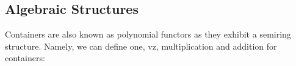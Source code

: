 {\subsection{Algebraic Structures}

Containers are also known as polynomial functors as they exhibit a semiring structure. Namely, we can define one, vz, multiplication and addition for containers:

\begin{code}%
\>[0]\AgdaSpace{}%
\AgdaSymbol{:}\AgdaSpace{}%
\<%
\\
\>[0]\AgdaSpace{}%
\AgdaSymbol{=}\AgdaSpace{}%
\AgdaSpace{}%
\AgdaSpace{}%
\AgdaSpace{}%
\<%
\\
%
\\[\AgdaEmptyExtraSkip]%
\>[0]\AgdaSpace{}%
\AgdaSymbol{:}\AgdaSpace{}%
\<%
\\
\>[0]\AgdaSpace{}%
\AgdaSymbol{=}\AgdaSpace{}%
\AgdaSpace{}%
\AgdaSpace{}%
\<%
\\
%
\\[\AgdaEmptyExtraSkip]%
\>[0]\AgdaSpace{}%
\AgdaSymbol{:}\AgdaSpace{}%
\AgdaSpace{}%
\AgdaSpace{}%
\AgdaSpace{}%
\AgdaSpace{}%
\<%
\\
\>[0]\AgdaSymbol{(}\AgdaSpace{}%
\AgdaSpace{}%
\AgdaSymbol{)}\AgdaSpace{}%
\AgdaSpace{}%
\AgdaSymbol{(}\AgdaSpace{}%
\AgdaSpace{}%
\AgdaSymbol{)}\AgdaSpace{}%
\AgdaSymbol{=}\AgdaSpace{}%
\AgdaSymbol{(}\AgdaSpace{}%
\AgdaSpace{}%
\AgdaSymbol{)}\AgdaSpace{}%
\AgdaSpace{}%
\AgdaSpace{}%
\AgdaSymbol{(}\AgdaSpace{}%
\AgdaOperator{\AgdaInductiveConstructor{,}}\AgdaSpace{}%
\AgdaSymbol{)}\AgdaSpace{}%
\AgdaSpace{}%
\AgdaSpace{}%
\AgdaSpace{}%
\AgdaSpace{}%
\AgdaSpace{}%
\<%
\\
%
\\[\AgdaEmptyExtraSkip]%

\end{code}}
